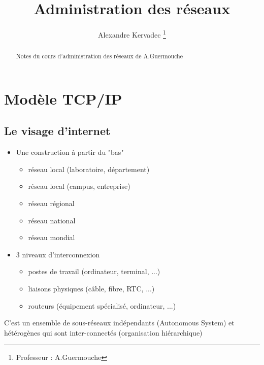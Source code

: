 \documentclass[journal, a4paper]{IEEEtran}
\begin{document}
	\title{Administration des réseaux}
	\author{Alexandre Kervadec
	\thanks{Professeur : A.Guermouche}}
	\maketitle

\begin{abstract}
	Notes du cours d'administration des réseaux de A.Guermouche
\end{abstract}

\section{Modèle TCP/IP}
	\subsection{Le visage d'internet}
	\begin{itemize}
		\item Une construction à partir du "bas"
		\begin{itemize}
			\item réseau local (laboratoire, département)
			\item réseau local (campus, entreprise)
			\item réseau régional
			\item réseau national
			\item réseau mondial
		\end{itemize}
		\item 3 niveaux d'interconnexion
		\begin{itemize}
			\item postes de travail (ordinateur, terminal, ...)
			\item liaisons physiques (câble, fibre, RTC, ...)
			\item routeurs (équipement spécialisé, ordinateur, ...)
		\end{itemize}
	\end{itemize}
	C'est un ensemble de sous-réseaux indépendants (Autonomous System) et hétérogènes qui sont inter-connectés (organisation hiérarchique)
	
\end{document}
